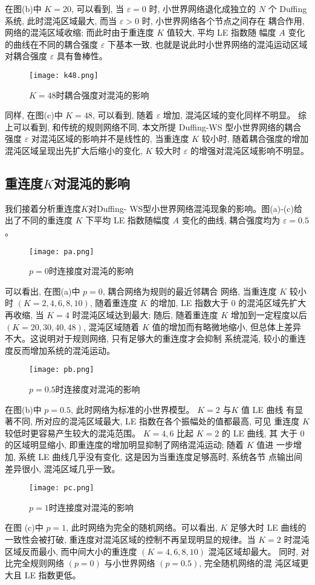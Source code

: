 在图(b)中 $K=20$, 可以看到, 当 $\varepsilon=0$ 时, 小世界网络退化成独立的 $N$ 个 Duffing系统, 此时混沌区域最大,
而当 $\varepsilon>0$ 时, 小世界网络各个节点之间存在 耦合作用, 网络的混沌区域收缩; 而此时由于重连度 $K$ 值较大, 平均 LE 指数随
幅度 $A$ 变化的曲线在不同的耦合强度 $\varepsilon$ 下基本一致, 也就是说此时小世界网络的混沌运动区域对耦合强度
$\varepsilon$ 具有鲁棒性。\par
\begin{figure}[!htbp]
    \centering
    \texttt{[image: k48.png]}
    \caption{$K=48$时耦合强度对混沌的影响}
\end{figure}
同样, 在图(c)中 $K=48$, 可以看到, 随着 $\varepsilon$ 增加, 混沌区域的变化同样不明显。
综上可以看到, 和传统的规则网络不同, 本文所提 Duffing-WS 型小世界网络的耦合强度 $\varepsilon$
对混沌区域的影响并不是线性的, 当重连度 $K$ 较小时, 随着耦合强度的增加混沌区域呈现出先扩大后缩小的变化,
$K$ 较大时 $\varepsilon$ 的增强对混沌区域影响不明显。


\subsection{重连度$K$对混沌的影响}
我们接着分析重连度$K$对Duffing- WS型小世界网络混沌现象的影响。图(a)-(c)给出了不同的重连度 $K$ 下平均 LE 指数随幅度 $A$ 变化的曲线, 耦合强度均为 $\varepsilon=0.5$ 。\par
\begin{figure}[!htbp]
    \centering
    \texttt{[image: pa.png]}
    \caption{$p=0$时连接度对混沌的影响}
\end{figure}
可以看出, 在图(a)中 $p=0$, 耦合网络为规则的最近邻耦合 网络, 当重连度 $K$ 较小时 $(K=2,4,6,8,10)$,
随着重连度 $K$ 的增加, LE 指数大于 0 的混沌区域先扩大再收缩, 当 $K=4$ 时混沌区域达到最大; 随后,
随着重连度 $K$ 增加到一定程度以后 $(K=20,30,40,48)$, 混沌区域随着 $K$ 值的增加而有略微地缩小,
但总体上差异不大。这说明对于规则网络, 只有足够大的重连度才会抑制 系统混沌, 较小的重连度反而增加系统的混沌运动。\par
\begin{figure}[!htbp]
    \centering
    \texttt{[image: pb.png]}
    \caption{$p=0.5$时连接度对混沌的影响}
\end{figure}
在图(b)中 $p=0.5$, 此时网络为标准的小世界模型。 $K=2$ 与$K$ 值 LE 曲线 有显著不同, 所对应的混沌区域最大,
LE 指数在各个振幅处的值都最高, 可见 重连度 $K$ 较低时更容易产生较大的混沌范围。 $K=4,6$ 比起 $K=2$ 的 LE 曲线, 其
大于 0 的区域明显缩小, 即重连度的增加明显抑制了网络混沌运动; 随着 $K$ 值进 一步增加, 系统 LE 曲线几乎没有变化,
这是因为当重连度足够高时, 系统各节 点输出间差异很小, 混沌区域几乎一致。\par
\begin{figure}[!htbp]
    \centering
    \texttt{[image: pc.png]}
    \caption{$p=1$时连接度对混沌的影响}
\end{figure}
在图 (c)中 $p=1$, 此时网络为完全的随机网络。可以看出, $K$ 足够大时 LE 曲线的一致性会被打破,
重连度对混沌区域的控制不再呈现明显的规律。当 $K=2$ 时混沌区域反而最小, 而中间大小的重连度 $(K=4,6,8,10)$ 混沌区域却最大。
同时, 对比完全规则网络 $(p=0)$ 与小世界网络 $(p=0.5)$, 完全随机网络的混 沌区域更大且 LE 指数更低。
